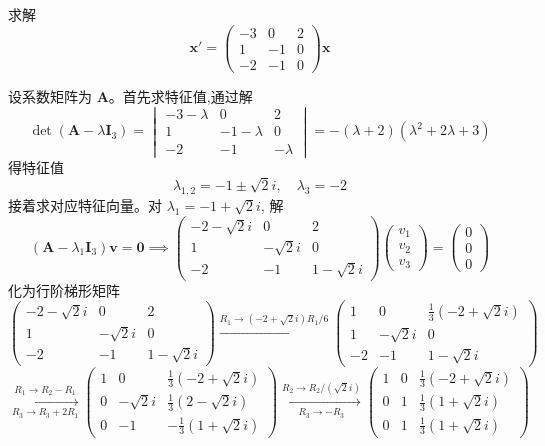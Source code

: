 \begin{questions}
    \question 求解
    \[
    \boldsymbol{x}' = \begin{pmatrix} -3 & 0 & 2 \\ 1 & -1 & 0 \\ -2 & -1 & 0 \end{pmatrix} \boldsymbol{x}
    \]
    \begin{solution}
        设系数矩阵为 $\boldsymbol{A}$。首先求特征值,通过解
        \[
        \det(\boldsymbol{A} - \lambda \boldsymbol{I}_3) 
        = \begin{vmatrix} -3-\lambda & 0 & 2 \\ 1 & -1-\lambda & 0 \\ -2 & -1 & -\lambda \end{vmatrix}
        = -(\lambda+2)(\lambda^2 + 2\lambda + 3)
        \]
        得特征值
        \[
        \lambda_{1,2} = -1 \pm \sqrt{2}i, \quad \lambda_3 = -2
        \]
        接着求对应特征向量。对 $\lambda_1 = -1+\sqrt{2}i$, 解
        \[
        (\boldsymbol{A} - \lambda_1 \boldsymbol{I}_3)\boldsymbol{v} = \boldsymbol{0} \implies 
        \begin{pmatrix} -2-\sqrt{2}i & 0 & 2 \\ 1 & -\sqrt{2}i & 0 \\ -2 & -1 & 1-\sqrt{2}i \end{pmatrix} \begin{pmatrix} v_1 \\ v_2 \\ v_3 \end{pmatrix} = \begin{pmatrix}0\\0\\0\end{pmatrix}
        \]
        化为行阶梯形矩阵
        \[
        \begin{pmatrix} -2-\sqrt{2}i & 0 & 2 \\ 1 & -\sqrt{2}i & 0 \\ -2 & -1 & 1-\sqrt{2}i \end{pmatrix} \xrightarrow{R_1 \to (-2+\sqrt{2}i)R_1/6} \begin{pmatrix} 1 & 0 & \frac{1}{3}(-2+\sqrt{2}i) \\ 1 & -\sqrt{2}i & 0 \\ -2 & -1 & 1-\sqrt{2}i \end{pmatrix}
        \]
        \[
        \xrightarrow[R_3 \to R_3 + 2R_1]{R_1 \to R_2 - R_1} \begin{pmatrix} 1 & 0 & \frac{1}{3}(-2+\sqrt{2}i) \\ 0 & -\sqrt{2}i & \frac{1}{3}(2-\sqrt{2}i) \\ 0 & -1 & -\frac{1}{3}(1+\sqrt{2}i) \end{pmatrix} \xrightarrow[R_3 \to -R_3]{R_2 \to R_2/(\sqrt{2}i)} \begin{pmatrix} 1 & 0 & \frac{1}{3}(-2+\sqrt{2}i) \\ 0 & 1 & \frac{1}{3}(1+\sqrt{2}i) \\ 0 & 1 & \frac{1}{3}(1+\sqrt{2}i) \end{pmatrix}
\]
\end{solution}
\end{questions}
